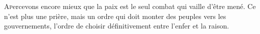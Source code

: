 \begin{multicols}{2}
\lettrine{\color{RoyalBlue}A\color{black}} percevons encore mieux que la paix
est le seul combat qui vaille d'être mené.  Ce n'est plus une prière, mais un
ordre qui doit monter des peuples vers les gouvernements, l'ordre de choisir
définitivement entre l'enfer et la raison.  \end{multicols}
